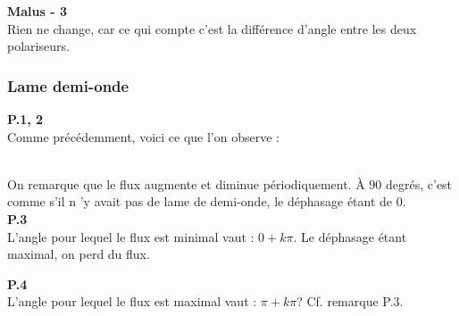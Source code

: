 \documentclass[british,french,11pt, a4paper, openany]{book}
\begin{document}
		\textbf{Malus - 3}\\
		Rien ne change, car ce qui compte c'est la différence d'angle entre les deux polariseurs.
		
		\subsubsection*{Lame demi-onde}
		\textbf{P.1, 2}\\
		Comme précédemment, voici ce que l'on observe : \\
		
		\begin{center}
		\end{center}\ \\
		On remarque que le flux augmente et diminue périodiquement. À $90$ degrés, c'est comme s'il n 'y avait pas de lame de demi-onde, le déphasage étant de 0.\\
		
		\textbf{P.3}\\
		L'angle pour lequel le flux est minimal vaut : $0 + k\pi$. Le déphasage étant maximal, on perd du flux.
		
		\textbf{P.4}\\
		L'angle pour lequel le flux est maximal vaut : $\pi + k\pi$? Cf. remarque P.3.\\
		
\end{document}
